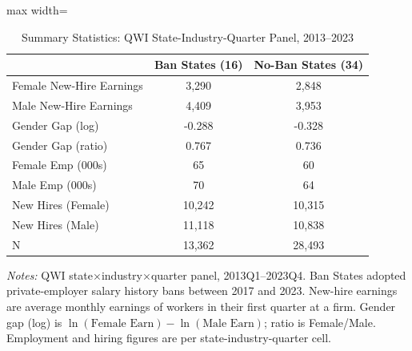 \begin{table}[htbp]
\centering
\caption{Summary Statistics: QWI State-Industry-Quarter Panel, 2013--2023}
\label{tab:sumstats}
\begin{threeparttable}
\begin{adjustbox}{max width=\textwidth}
\begin{tabular}{lcc}
\toprule
 & Ban States (16) & No-Ban States (34) \\
\midrule
Female New-Hire Earnings & 3,290 & 2,848 \\
Male New-Hire Earnings & 4,409 & 3,953 \\
Gender Gap (log) & -0.288 & -0.328 \\
Gender Gap (ratio) & 0.767 & 0.736 \\
Female Emp (000s) & 65 & 60 \\
Male Emp (000s) & 70 & 64 \\
New Hires (Female) & 10,242 & 10,315 \\
New Hires (Male) & 11,118 & 10,838 \\
N & 13,362 & 28,493 \\
\bottomrule
\end{tabular}
\end{adjustbox}
\begin{tablenotes}[flushleft]
\small
\item \textit{Notes:} QWI state$\times$industry$\times$quarter panel, 2013Q1--2023Q4.
Ban States adopted private-employer salary history bans between 2017 and 2023.
New-hire earnings are average monthly earnings of workers in their first quarter at a firm.
Gender gap (log) is $\ln(\text{Female Earn}) - \ln(\text{Male Earn})$; ratio is Female/Male.
Employment and hiring figures are per state-industry-quarter cell.
\end{tablenotes}
\end{threeparttable}
\end{table}
